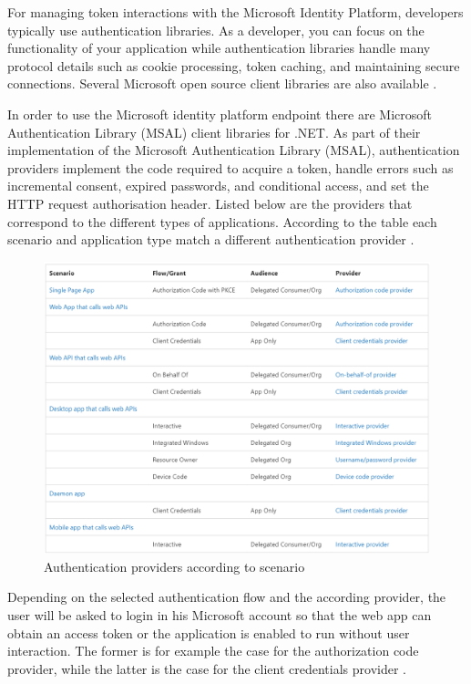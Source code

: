 For managing token interactions with the Microsoft Identity Platform, developers typically use authentication libraries. As a developer, you can focus on the functionality of your application while authentication libraries handle many protocol details such as cookie processing, token caching, and maintaining secure connections. Several Microsoft open source client libraries are also available \cite{MSAA}.

In order to use the Microsoft identity platform endpoint there are Microsoft Authentication Library (MSAL) client libraries for .NET. As part of their implementation of the Microsoft Authentication Library (MSAL), authentication providers implement the code required to acquire a token, handle errors such as incremental consent, expired passwords, and conditional access, and set the HTTP request authorisation header. Listed below are the providers that correspond to the different types of applications. According to the table each scenario and application type match a different authentication provider \cite{MSAuthPr}.

\begin{figure}[h!]
  \includegraphics[scale=0.95]{Figures/Authentication providers.png}
  \caption{Authentication providers according to scenario}
  \label{fig:Authentication providers according to scenario}
\end{figure}

Depending on the selected authentication flow and the according provider, the user will be asked to login in his Microsoft account so that the web app can obtain an access token or the application is enabled to run without user interaction. The former is for example the case for the authorization code provider, while the latter is the case for the client credentials provider \cite{MSAuthPr}.









